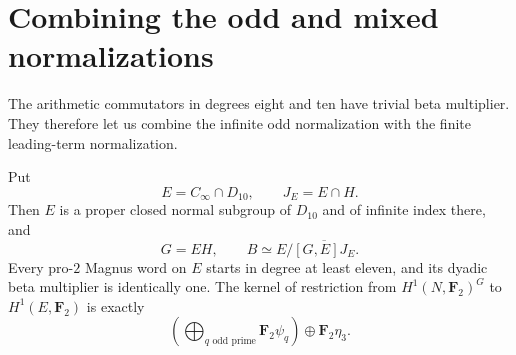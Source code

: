 \section{Combining the odd and mixed normalizations}
\label{sec:dyadic-metabelian-intersection}

The arithmetic commutators in degrees eight and ten have trivial beta
multiplier. They therefore let us combine the infinite odd normalization
with the finite leading-term normalization.

\begin{corollary}\label{cor:dyadic-metabelian-deep-gate}
Put
\[
 E=C_\infty\cap D_{10},\qquad J_E=E\cap H.
\]
Then $E$ is a proper closed normal subgroup of $D_{10}$ and of
infinite index there, and
\[
 G=EH,\qquad B\simeq E/\overline{[G,E]J_E}.
\]
Every pro-$2$ Magnus word on $E$ starts in degree at least eleven,
and its dyadic beta multiplier is identically one.
The kernel of restriction from $H^1(N,\mathbf F_2)^G$ to
$H^1(E,\mathbf F_2)$ is exactly
\[
 \left(\bigoplus_{q\text{ odd prime}}\mathbf F_2\psi_q\right)
                   \oplus\mathbf F_2\eta_3.
\]
\end{corollary}

